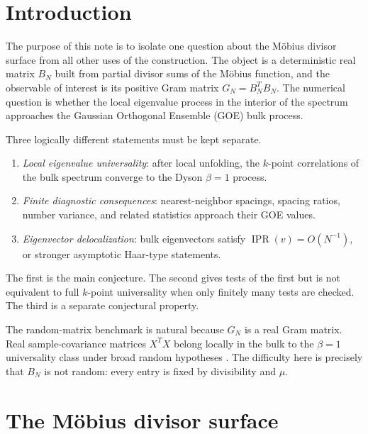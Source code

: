 \documentclass[11pt]{amsart}
\numberwithin{equation}{section}
\theoremstyle{plain}
\theoremstyle{definition}
\theoremstyle{remark}
\newcommand{\mob}{\mu}
\newcommand{\IPR}{\operatorname{IPR}}
\begin{document}
\maketitle
\tableofcontents
\bigskip

\section{Introduction}
\label{sec:introduction}

The purpose of this note is to isolate one question about the M\"obius divisor surface from all other uses of the construction.  The object is a deterministic real matrix $B_N$ built from partial divisor sums of the M\"obius function, and the observable of interest is its positive Gram matrix $G_N=B_N^TB_N$.  The numerical question is whether the local eigenvalue process in the interior of the spectrum approaches the Gaussian Orthogonal Ensemble (GOE) bulk process.

Three logically different statements must be kept separate.

\begin{enumerate}[label=(\roman*)]
\item \emph{Local eigenvalue universality}: after local unfolding, the $k$-point correlations of the bulk spectrum converge to the Dyson $\beta=1$ process.
\item \emph{Finite diagnostic consequences}: nearest-neighbor spacings, spacing ratios, number variance, and related statistics approach their GOE values.
\item \emph{Eigenvector delocalization}: bulk eigenvectors satisfy $\IPR(v)=O(N^{-1})$, or stronger asymptotic Haar-type statements.
\end{enumerate}

The first is the main conjecture.  The second gives tests of the first but is not equivalent to full $k$-point universality when only finitely many tests are checked.  The third is a separate conjectural property.

The random-matrix benchmark is natural because $G_N$ is a real Gram matrix.  Real sample-covariance matrices $X^TX$ belong locally in the bulk to the $\beta=1$ universality class under broad random hypotheses \cite{TaoVu2012,PillaiYin2014}.  The difficulty here is precisely that $B_N$ is not random: every entry is fixed by divisibility and $\mob$.

\section{The M\"obius divisor surface}
\label{sec:mobius_surface}
\end{document}
